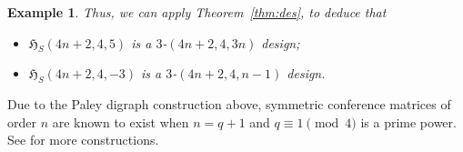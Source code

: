 \documentclass[11pt]{article}
\newtheorem{example}[theorem]{Example}
\begin{document}
\begin{example}
Thus, we can apply Theorem~\ref{thm:des}, to deduce that 
\begin{itemize}
    \item $\mathfrak H_{S}(4n+2,4,5)$ is a $3$-$(4n+2,4,3n)$ design;
    \item  $\mathfrak H_{S}(4n+2,4,-3)$ is a $3$-$(4n+2,4,n-1)$ design.
\end{itemize}
\end{example}

Due to the Paley digraph construction above, symmetric conference matrices of order $n$ are known to exist when $n = q+1$ and $q \equiv 1 \pmod 4$ is a prime power. See \cite{BS} for more constructions. 
\end{document}
